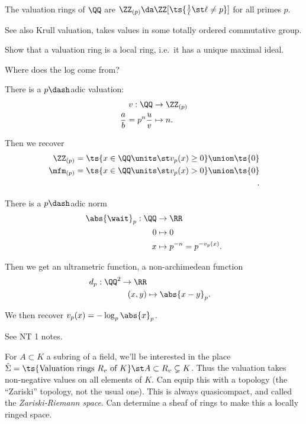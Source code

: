 \begin{example}

The valuation rings of \(\QQ\) are
\(\ZZ_{(p)}\da \ZZ[\ts{{1\over \ell} \st \ell\neq p}]\) for all primes
\(p\).

\end{example}

See also Krull valuation, takes values in some totally ordered
commutative group.

\begin{exercise}

Show that a valuation ring is a local ring, i.e.~it has a unique maximal
ideal.

\end{exercise}

\begin{example}

Where does the log come from?

There is a \(p\dash\)adic valuation:
\begin{align*}  
v: \QQ &\to \ZZ_{(p)} \\
{a\over b} = p^n {u \over v} &\mapsto n
.\end{align*}

Then we recover
\begin{align*}  
\ZZ_{(p)} = \ts {x\in \QQ\units \st v_p(x) \geq 0} \union \ts{0} \\
\mfm_{(p)} = \ts {x\in \QQ\units \st v_p(x) > 0} \union \ts{0} \\
.\end{align*}

There is a \(p\dash\)adic norm
\begin{align*}  
\abs{\wait}_p: \QQ &\to \RR \\
0 & \mapsto 0 \\
x &\mapsto p^{-n} = p^{-v_p(x)}
.\end{align*}

Then we get an ultrametric function, a non-archimedean function
\begin{align*}  
d_p: \QQ^2 \to \RR \\
(x, y) &\mapsto \abs{x- y}_p
.\end{align*}

We then recover \(v_p(x) = -\log_p \abs{x}_p\).

See NT 1 notes.

\end{example}

For \(A\subset K\) a subring of a field, we'll be interested in the
place
\(\tilde \Sigma = \ts{\text{Valuation rings } R_v \text{ of } K} \st A \subset R_v \subsetneq K\).
Thus the valuation takes non-negative values on all elements of \(K\).
Can equip this with a topology (the ``Zariski'' topology, not the usual
one). This is always quasicompact, and called the \emph{Zariski-Riemann
space}. Can determine a sheaf of rings to make this a locally ringed
space.

